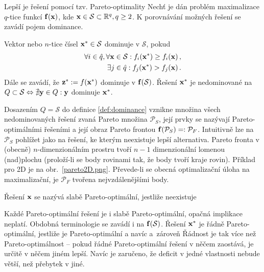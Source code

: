 Lepší je řešení pomocí tzv. Pareto-optimality Nechť je dán 
problém maximalizace $q$-tice funkcí $\mathbf{f(x)}$, 
kde $\mathbf{x} \in \mathcal{S}\subset\mathbb{R}^q, q\geq 2$.
K porovnávání možných řešení se zavádí pojem dominance. 
\begin{define}[Dominance]
	\label{def:dominance}
Vektor nebo $n$-tice čísel $\mathbf{x}^{\ast}\in \mathcal{S}$ dominuje v $\mathcal{S}$, 
pokud 
\begin{align}
	\forall i\in \hat{q}, \forall\mathbf{x}\in\mathcal{S}: f_i(\mathbf{x}^{\ast}) \geq f_i(\mathbf{x})\,,\\
	\exists j\in\hat{q}: f_j(\mathbf{x}^{\ast})>f_j(\mathbf{x})\,.
\end{align}
Dále se zavádí, že $\mathbf{z}^{\ast}:=f(\mathbf{x}^{\ast})$ dominuje v $\mathbf{f}(\mathcal{S})$. 
Řešení $\mathbf{x}^{\ast}$ je nedominované na $Q\subset\mathcal{S} \Leftrightarrow \nexists \mathbf{y}\in Q: \mathbf{y}$ dominuje $\mathbf{x}^{\ast}$.
\end{define}
Dosazením $Q=\mathcal{S}$ do definice \eqref{def:dominance} vznikne množina všech nedominovaných řešení zvaná Pareto množina $\mathcal{P}_S$, její prvky 
se nazývají Pareto-optimálními 
řešeními a její obraz Pareto frontou $\mathbf{f}(\mathcal{P}_S) =: \mathcal{P}_{F}$. Intuitivně lze na $\mathcal{P}_S$ pohlížet jako na řešení, 
ke kterým neexistuje lepší alternativa. 
Pareto fronta v (obecně) $n$-dimenzionálním prostru tvoří $n-1$ dimenzionální lomenou (nad)plochu (proloží-li se body rovinami tak, že 
body tvoří kraje rovin). Příklad pro 2D je na obr.~\ref{pareto2D.png}. Převede-li se obecná optimalizační úloha na 
maximalizační, je $\mathcal{P}_F$ tvořena nejvzdálenějšími body. 
\begin{define}
	\label{def:slaba_pareto_optim}
Řešení $\mathbf{x}$ se nazývá slabě Pareto-optimální, jestliže neexistuje 
\end{define}
Každé Pareto-optimální řešení je i slabě Pareto-optimální, opačná implikace neplatí. Obdobná terminologie se zavádí i na $\mathbf{f}(\mathcal{S})$. 
Řešení $\mathbf{x}^{\ast}$ je řádně Pareto-optimální, jestliže je Pareto-optimální 
a navíc 
a~zároveň 
Řádnost je tak více než 
Pareto-optimálnost -- pokud řádné Pareto-optimální řešení v něčem zaostává, je určitě v něčem jiném lepší. Navíc je zaručeno, že 
deficit v jedné vlastnosti nebude  větší, než přebytek v jiné.

